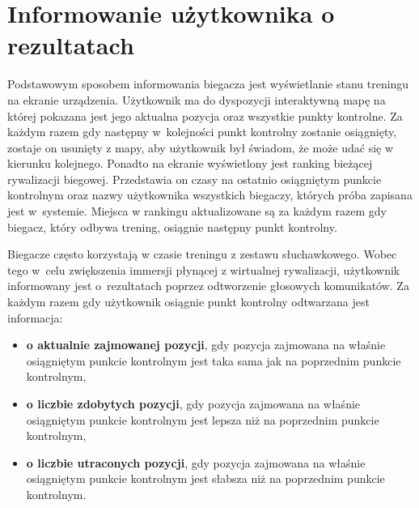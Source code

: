 \section{Informowanie użytkownika o rezultatach}\label{chap:zasada-tts}
Podstawowym sposobem informowania biegacza jest wyświetlanie stanu treningu na ekranie urządzenia. Użytkownik ma do dyspozycji interaktywną mapę na której pokazana jest jego aktualna pozycja oraz wszystkie punkty kontrolne. Za każdym razem gdy następny w~kolejności punkt kontrolny zostanie osiągnięty, zostaje on usunięty z mapy, aby użytkownik był świadom, że może udać się w kierunku kolejnego. Ponadto na ekranie wyświetlony jest ranking bieżącej rywalizacji biegowej. Przedstawia on czasy na ostatnio osiągniętym punkcie kontrolnym oraz nazwy użytkownika wszystkich biegaczy, których próba zapisana jest w~systemie. Miejsca w rankingu aktualizowane są za każdym razem gdy biegacz, który odbywa trening, osiągnie następny punkt kontrolny.

Biegacze często korzystają w czasie treningu z zestawu słuchawkowego. Wobec tego w~celu zwiększenia immersji płynącej z wirtualnej rywalizacji, użytkownik informowany jest o~rezultatach poprzez odtworzenie głosowych komunikatów. Za każdym razem gdy użytkownik osiągnie punkt kontrolny odtwarzana jest informacja:
\begin{itemize}
\item{\textbf{o aktualnie zajmowanej pozycji}, gdy pozycja zajmowana na właśnie osiągniętym punkcie kontrolnym jest taka sama jak na poprzednim punkcie kontrolnym},
\item{\textbf{o liczbie zdobytych pozycji}, gdy pozycja zajmowana na właśnie osiągniętym punkcie kontrolnym jest lepsza niż na poprzednim punkcie kontrolnym},
\item{\textbf{o liczbie utraconych pozycji}, gdy pozycja zajmowana na właśnie osiągniętym punkcie kontrolnym jest słabsza niż na poprzednim punkcie kontrolnym}.
\end{itemize}